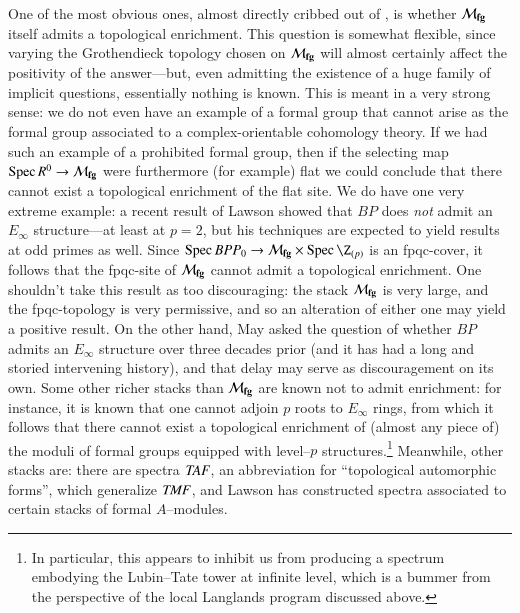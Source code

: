 One of the most obvious ones, almost directly cribbed out of , is whether $\mathcal{M}_{\mathbf{fg}}$ itself admits a topological enrichment.  This question is somewhat flexible, since varying the Grothendieck topology chosen on $\mathcal{M}_{\mathbf{fg}}$ will almost certainly affect the positivity of the answer---but, even admitting the existence of a huge family of implicit questions, essentially nothing is known.  This is meant in a very strong sense: we do not even have an example of a formal group that cannot arise as the formal group associated to a complex-orientable cohomology theory.  If we had such an example of a prohibited formal group, then if the selecting map $\operatorname{Spec} R^0 \to \mathcal{M}_{\mathbf{fg}}$ were furthermore (for example) flat we could conclude that there cannot exist a topological enrichment of the flat site.  We do have one very extreme example: a recent result of Lawson showed that $BP$ does \emph{not} admit an $E_\infty$ structure---at least at $p = 2$, but his techniques are expected to yield results at odd primes as well.  Since $\Spec BPP_0 \to \moduli{fg} \times \Spec \Z_{(p)}$ is an fpqc-cover, it follows that the fpqc-site of $\mathcal{M}_{\mathbf{fg}}$ cannot admit a topological enrichment.  One shouldn't take this result as too discouraging: the stack $\mathcal{M}_{\mathbf{fg}}$ is very large, and the fpqc-topology is very permissive, and so an alteration of either one may yield a positive result.  On the other hand, May asked the question of whether $BP$ admits an $E_\infty$ structure over three decades prior (and it has had a long and storied intervening history), and that delay may serve as discouragement on its own.  Some other richer stacks than $\mathcal{M}_{\mathbf{fg}}$ are known not to admit enrichment: for instance, it is known that one cannot adjoin $p${\th} roots to $E_\infty$ rings, from which it follows that there cannot exist a topological enrichment of (almost any piece of) the moduli of formal groups equipped with level--$p$ structures.\footnote{In particular, this appears to inhibit us from producing a spectrum embodying the Lubin--Tate tower at infinite level, which is a bummer from the perspective of the local Langlands program discussed above.}  Meanwhile, other stacks are: there are spectra $\mathit{TAF}$, an abbreviation for ``topological automorphic forms'', which generalize $\mathit{TMF}$, and Lawson has constructed spectra associated to certain stacks of formal $A$--modules.


